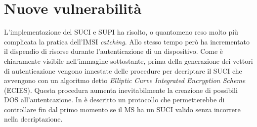 \section{Nuove vulnerabilità}
L'implementazione del SUCI e SUPI ha risolto, o quantomeno reso molto più complicata la pratica dell'IMSI \textit{catching}. Allo stesso tempo però ha incrementato il dispendio di risorse durante l'autenticazione
di un dispositivo. Come è chiaramente visibile nell'immagine sottostante, prima della generazione dei vettori di autenticazione vengono innestate delle procedure per decriptare il SUCI che avvengono con un algoritmo detto 
\textit{Elliptic Curve Integrated Encryption Scheme} (ECIES). 
Questa procedura aumenta inevitabilmente la creazione di possibili DOS all'autentcazione. 
In \cite{5g-lightweight} è descritto un protocollo che permetterebbe di controllare fin dal primo momento se il MS ha un SUCI valido senza incorrere nella decriptazione.
